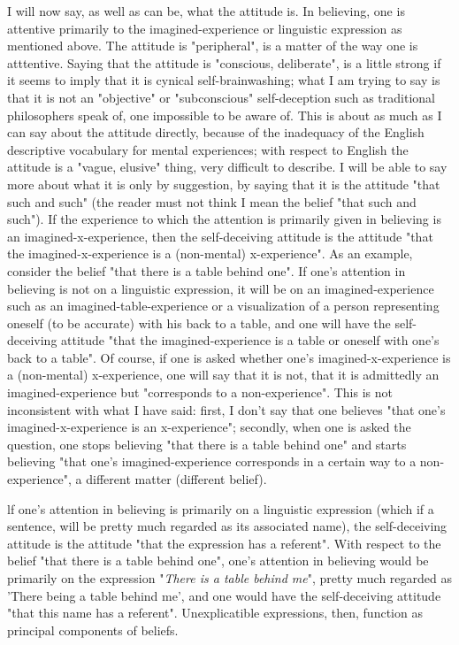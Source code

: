 \documentclass[10pt,twoside,draft]{memoir}
\newcommand{\lexpression}[1]{"\emph{#1}"}
\newcommand{\expression}[1]{\lexpression{#1}}
\begin{document}
{I will now say, as well as can be, what the attitude is. In believing, one 
is attentive primarily to the imagined-experience or linguistic expression as 
mentioned above. The attitude is "peripheral", is a matter of the way one is 
atttentive. Saying that the attitude is "conscious, deliberate", is a little 
strong if it seems to imply that it is cynical self-brainwashing; what I am 
trying to say is that it is not an "objective" or "subconscious" self-deception 
such as traditional philosophers speak of, one impossible to be aware of. This 
is about as much as I can say about the attitude directly, because of the 
inadequacy of the English descriptive vocabulary for mental experiences; 
with respect to English the attitude is a "vague, elusive" thing, very difficult 
to describe. I will be able to say more about what it is only by suggestion, by 
saying that it is the attitude "that such and such" (the reader must not think 
I mean the belief "that such and such"). If the experience to which the 
attention is primarily given in believing is an imagined-x-experience, then the 
self-deceiving attitude is the attitude "that the imagined-x-experience is a 
(non-mental) x-experience". As an example, consider the belief "that there is 
a table behind one". If one's attention in believing is not on a linguistic 
expression, it will be on an imagined-experience such as an 
imagined-table-experience or a visualization of a person representing oneself 
(to be accurate) with his back to a table, and one will have the self-deceiving 
attitude "that the imagined-experience is a table or oneself with one's back 
to a table". Of course, if one is asked whether one's imagined-x-experience is 
a (non-mental) x-experience, one will say that it is not, that it is admittedly 
an imagined-experience but "corresponds to a non-experience". This is not 
inconsistent with what I have said: first, I don't say that one believes "that 
one's imagined-x-experience is an x-experience"; secondly, when one is asked 
the question, one stops believing "that there is a table behind one" and starts 
believing "that one's imagined-experience corresponds in a certain way to a 
non-experience", a different matter (different belief). 

lf one's attention in believing is primarily on a linguistic expression 
(which if a sentence, will be pretty much regarded as its associated name), 
the self-deceiving attitude is the attitude "that the expression has a 
referent". With respect to the belief "that there is a table behind one", one's 
attention in believing would be primarily on the expression \expression{There is a table 
behind me}, pretty much regarded as 'There being a table behind me', and 
one would have the self-deceiving attitude "that this name has a referent". 
Unexplicatible expressions, then, function as principal components of 
beliefs. 

}
\end{document}
